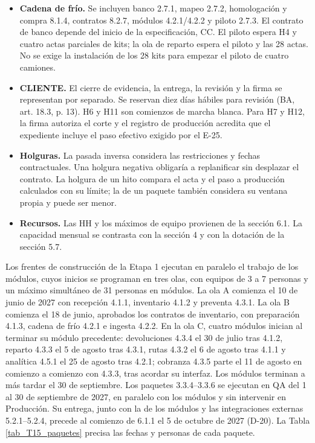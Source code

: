 \begin{itemize}
\item \textbf{Cadena de frío.} Se incluyen banco 2.7.1, mapeo 2.7.2, homologación y compra 8.1.4, contratos 8.2.7, módulos 4.2.1/4.2.2 y piloto 2.7.3. El contrato de banco depende del inicio de la especificación, CC. El piloto espera H4 y cuatro actas parciales de kits; la ola de reparto espera el piloto y las 28 actas. No se exige la instalación de los 28 kits para empezar el piloto de cuatro camiones.
\item \textbf{CLIENTE.} El cierre de evidencia, la entrega, la revisión y la firma se representan por separado. Se reservan diez días hábiles para revisión (BA, art. 18.3, p. 13). H6 y H11 son comienzos de marcha blanca. Para H7 y H12, la firma autoriza el corte y el registro de producción acredita que el expediente incluye el paso efectivo exigido por el E-25.
\item \textbf{Holguras.} La pasada inversa considera las restricciones y fechas contractuales. Una holgura negativa obligaría a replanificar sin desplazar el contrato. La holgura de un hito compara el acta y el paso a producción calculados con su límite; la de un paquete también considera su ventana propia y puede ser menor.
\item \textbf{Recursos.} Las HH y los máximos de equipo provienen de la sección 6.1. La capacidad mensual se contrasta con la sección 4 y con la dotación de la sección 5.7.
\end{itemize}

Los frentes de construcción de la Etapa 1 ejecutan en paralelo el trabajo de los módulos, cuyos inicios se programan en tres olas, con equipos de 3 a 7 personas y un máximo simultáneo de 31 personas en módulos. La ola A comienza el 10 de junio de 2027 con recepción 4.1.1, inventario 4.1.2 y preventa 4.3.1. La ola B comienza el 18 de junio, aprobados los contratos de inventario, con preparación 4.1.3, cadena de frío 4.2.1 e ingesta 4.2.2. En la ola C, cuatro módulos inician al terminar su módulo precedente: devoluciones 4.3.4 el 30 de julio tras 4.1.2, reparto 4.3.3 el 5 de agosto tras 4.3.1, rutas 4.3.2 el 6 de agosto tras 4.1.1 y analítica 4.5.1 el 25 de agosto tras 4.2.1; cobranza 4.3.5 parte el 11 de agosto en comienzo a comienzo con 4.3.3, tras acordar su interfaz. Los módulos terminan a más tardar el 30 de septiembre. Los paquetes 3.3.4–3.3.6 se ejecutan en QA del 1 al 30 de septiembre de 2027, en paralelo con los módulos y sin intervenir en Producción. Su entrega, junto con la de los módulos y las integraciones externas 5.2.1–5.2.4, precede al comienzo de 6.1.1 el 5 de octubre de 2027 (D-20). La Tabla \ref{tab_T15_paquetes} precisa las fechas y personas de cada paquete.

